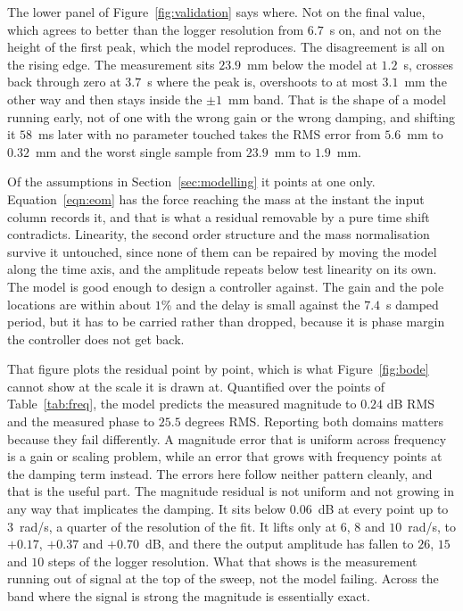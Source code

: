 The lower panel of Figure~\ref{fig:validation} says where. Not on the final value, which agrees
to better than the logger resolution from $6.7$~s on, and not on the height of the first peak,
which the model reproduces. The disagreement is all on the rising edge. The measurement sits
$23.9$~mm below the model at $1.2$~s, crosses back through zero at $3.7$~s where the peak is,
overshoots to at most $3.1$~mm the other way and then stays inside the $\pm 1$~mm band. That is
the shape of a model running early, not of one with the wrong gain or the wrong damping, and
shifting it $58$~ms later with no parameter touched takes the RMS error from $5.6$~mm to
$0.32$~mm and the worst single sample from $23.9$~mm to $1.9$~mm.

Of the assumptions in Section~\ref{sec:modelling} it points at one only. Equation~\ref{eqn:eom}
has the force reaching the mass at the instant the input column records it, and that is what a
residual removable by a pure time shift contradicts. Linearity, the second order structure and
the mass normalisation survive it untouched, since none of them can be repaired by moving the
model along the time axis, and the amplitude repeats below test linearity on its own. The model is good enough to design a controller against. The gain
and the pole locations are within about $1$\% and the delay is small against the $7.4$~s damped
period, but it has to be carried rather than dropped, because it is phase margin the controller
does not get back.

That figure plots the residual point by point, which is what Figure~\ref{fig:bode} cannot show
at the scale it is drawn at. Quantified over the points of Table~\ref{tab:freq}, the model
predicts the measured magnitude to $0.24$ dB RMS and the measured phase to $25.5$ degrees RMS.
Reporting both domains matters because they fail differently. A magnitude error that is uniform
across frequency is a gain or scaling problem, while an error that grows with frequency points
at the damping term instead. The errors here follow neither pattern cleanly, and that is the
useful part. The magnitude residual is not uniform and not growing in any way that implicates
the damping. It sits below $0.06$~dB at every point up to $3$~rad/s, a quarter of the
resolution of the fit. It lifts only at $6$, $8$ and $10$~rad/s, to $+0.17$, $+0.37$ and
$+0.70$~dB, and there the output amplitude has fallen to $26$, $15$ and $10$ steps of the
logger resolution. What that shows is the measurement running out of signal at the top of the
sweep, not the model failing. Across the band where the signal is strong the magnitude is
essentially exact.

